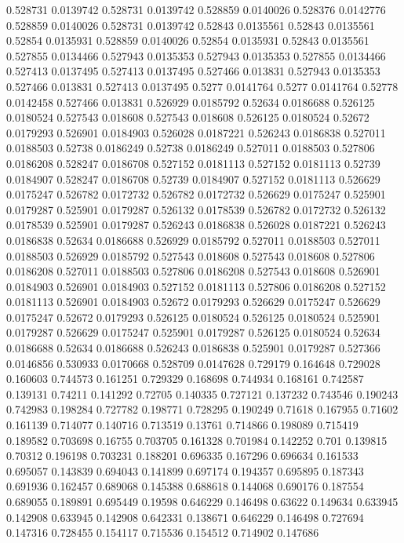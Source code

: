 0.528731 0.0139742
0.528731 0.0139742
0.528859 0.0140026
0.528376 0.0142776
0.528859 0.0140026
0.528731 0.0139742
0.52843 0.0135561
0.52843 0.0135561
0.52854 0.0135931
0.528859 0.0140026
0.52854 0.0135931
0.52843 0.0135561
0.527855 0.0134466
0.527943 0.0135353
0.527943 0.0135353
0.527855 0.0134466
0.527413 0.0137495
0.527413 0.0137495
0.527466 0.013831
0.527943 0.0135353
0.527466 0.013831
0.527413 0.0137495
0.5277 0.0141764
0.5277 0.0141764
0.52778 0.0142458
0.527466 0.013831
0.526929 0.0185792
0.52634 0.0186688
0.526125 0.0180524
0.527543 0.018608
0.527543 0.018608
0.526125 0.0180524
0.52672 0.0179293
0.526901 0.0184903
0.526028 0.0187221
0.526243 0.0186838
0.527011 0.0188503
0.52738 0.0186249
0.52738 0.0186249
0.527011 0.0188503
0.527806 0.0186208
0.528247 0.0186708
0.527152 0.0181113
0.527152 0.0181113
0.52739 0.0184907
0.528247 0.0186708
0.52739 0.0184907
0.527152 0.0181113
0.526629 0.0175247
0.526782 0.0172732
0.526782 0.0172732
0.526629 0.0175247
0.525901 0.0179287
0.525901 0.0179287
0.526132 0.0178539
0.526782 0.0172732
0.526132 0.0178539
0.525901 0.0179287
0.526243 0.0186838
0.526028 0.0187221
0.526243 0.0186838
0.52634 0.0186688
0.526929 0.0185792
0.527011 0.0188503
0.527011 0.0188503
0.526929 0.0185792
0.527543 0.018608
0.527543 0.018608
0.527806 0.0186208
0.527011 0.0188503
0.527806 0.0186208
0.527543 0.018608
0.526901 0.0184903
0.526901 0.0184903
0.527152 0.0181113
0.527806 0.0186208
0.527152 0.0181113
0.526901 0.0184903
0.52672 0.0179293
0.526629 0.0175247
0.526629 0.0175247
0.52672 0.0179293
0.526125 0.0180524
0.526125 0.0180524
0.525901 0.0179287
0.526629 0.0175247
0.525901 0.0179287
0.526125 0.0180524
0.52634 0.0186688
0.52634 0.0186688
0.526243 0.0186838
0.525901 0.0179287
0.527366 0.0146856
0.530933 0.0170668
0.528709 0.0147628
0.729179 0.164648
0.729028 0.160603
0.744573 0.161251
0.729329 0.168698
0.744934 0.168161
0.742587 0.139131
0.74211 0.141292
0.72705 0.140335
0.727121 0.137232
0.743546 0.190243
0.742983 0.198284
0.727782 0.198771
0.728295 0.190249
0.71618 0.167955
0.71602 0.161139
0.714077 0.140716
0.713519 0.13761
0.714866 0.198089
0.715419 0.189582
0.703698 0.16755
0.703705 0.161328
0.701984 0.142252
0.701 0.139815
0.70312 0.196198
0.703231 0.188201
0.696335 0.167296
0.696634 0.161533
0.695057 0.143839
0.694043 0.141899
0.697174 0.194357
0.695895 0.187343
0.691936 0.162457
0.689068 0.145388
0.688618 0.144068
0.690176 0.187554
0.689055 0.189891
0.695449 0.19598
0.646229 0.146498
0.63622 0.149634
0.633945 0.142908
0.633945 0.142908
0.642331 0.138671
0.646229 0.146498
0.727694 0.147316
0.728455 0.154117
0.715536 0.154512
0.714902 0.147686
